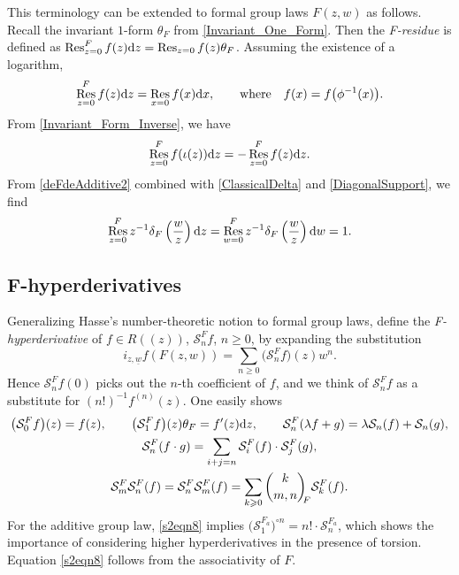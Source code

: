 \documentclass[pdftex]{sigma}
\numberwithin{equation}{section}
\theoremstyle{definition}
\DeclareMathOperator\Res{Res}
\newcommand\Fbinom[2]{\binom{#1}{#2}_{\!\!F}}
\begin{document}
This terminology can be extended to formal group laws $F(z,w)$ as follows. Recall the invariant $1$-form $\theta_F$ from \eqref{Invariant_One_Form}. Then the \emph{F-residue} is defined as
$
 \Res_{z=0}^F f(z){\rm d}z=\Res_{z=0}f(z)\theta_F$.
Assuming the existence of a logarithm,
\begin{align}
\label{s2eqn5}
 \Res_{z=0}^F f(z){\rm d}z=\Res_{x=0} f(x){\rm d}x,
 \qquad\text{where}\quad f(x)=f\bigl(\phi^{-1}(x)\bigr).
\end{align}
From \eqref{Invariant_Form_Inverse}, we have
\begin{equation}
\label{residue-inversion}
 \Res_{z=0}^F f(\iota(z)){\rm d}z=-\Res_{z=0}^F f(z){\rm d}z.
\end{equation}
From \eqref{deFdeAdditive2} combined with \eqref{ClassicalDelta} and \eqref{DiagonalSupport}, we find
\[
 \Res_{z=0}^Fz^{-1}\delta_F\left(\frac{w}{z}\right){\rm d}z=\Res_{w=0}^Fz^{-1}\delta_F\left(\frac{w}{z}\right){\rm d}w=1.
\]

\subsection[F-hyperderivatives]{$\boldsymbol{F}$-hyperderivatives}
\label{s38}

Generalizing Hasse's number-theoretic notion to formal group laws, define the \emph{F-hyperderivative} of $f\in R(\!( z)\!)$, $\mathcal{S}^F_n f$, $n\geqslant0$, by expanding the substitution
\begin{equation}
\label{def-F-hyper}
 i_{z,\underline{w}}f(F(z,w))=\sum_{n\geqslant0}\bigl(\mathcal{S}^F_n f\bigr)(z)w^n.
\end{equation}
Hence $\mathcal{S}^F_nf(0)$ picks out the $n$-th coefficient of $f$, and we think of $\mathcal{S}^F_n f$ as a substitute for $(n!)^{-1}f^{(n)}(z)$. One easily shows
\begin{gather}%
 \bigl(\mathcal{S}_0^F f\bigr)(z)=f(z),\qquad
 \bigl(\mathcal{S}_1^F f\bigr)(z)\theta_F=f'(z){\rm d}z,\qquad
 \mathcal{S}_n^F(\lambda f+g)=\lambda\mathcal{S}_n(f)+\mathcal{S}_n(g),\nonumber\\
 \mathcal{S}_n^F(f\cdot g)=\sum_{i+j=n} \mathcal{S}_i^F(f)\cdot \mathcal{S}_j^F(g),\label{s2eqn7}\\
 \mathcal{S}_m^F\mathcal{S}_n^F(f)=\mathcal{S}_n^F\mathcal{S}_m^F(f)=\sum_{k\geqslant0}\Fbinom{k}{m,n}\mathcal{S}_k^F(f).\label{s2eqn8}
\end{gather}
For the additive group law, \eqref{s2eqn8} implies $\bigl(\mathcal{S}_1^{F_a}\bigr)^{\circ n}=n!\cdot\mathcal{S}^{F_a}_n$, which shows the importance of considering higher hyperderivatives in the presence of torsion. Equation \eqref{s2eqn8} follows from the associativity of $F$.
\end{document}
